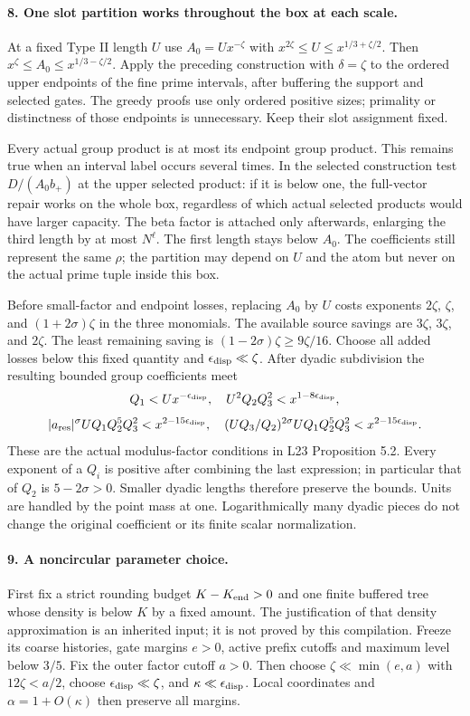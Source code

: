 \paragraph{8. One slot partition works throughout the box at each scale.}
At a fixed Type II length $U$ use $A_0=Ux^{-\zeta}$ with
$x^{2\zeta}\le U\le x^{1/3+\zeta/2}$. Then
$x^\zeta\le A_0\le x^{1/3-\zeta/2}$.
Apply the preceding construction with $\delta=\zeta$ to the ordered
upper endpoints of the fine prime intervals, after buffering the
support and selected gates. The greedy proofs use only ordered
positive sizes; primality or distinctness of those endpoints is
unnecessary. Keep their slot assignment fixed.

Every actual group product is at most its endpoint group product.
This remains true when an interval label occurs several times. In
the selected construction test $D/(A_0b_+)$ at the upper selected
product: if it is below one, the full-vector repair works on the
whole box, regardless of which actual selected products would have
larger capacity. The beta factor is attached only afterwards, enlarging
the third length by at most $N^\ell$. The first length stays below
$A_0$. The coefficients still represent the same $\rho$; the
partition may depend on $U$ and the atom but never on the actual
prime tuple inside this box.

Before small-factor and endpoint losses, replacing $A_0$ by $U$
costs exponents $2\zeta$, $\zeta$, and $(1+2\sigma)\zeta$ in the
three monomials. The available source savings are $3\zeta$,
$3\zeta$, and $2\zeta$. The least remaining saving is
$(1-2\sigma)\zeta\ge9\zeta/16$. Choose all added losses below this
fixed quantity and $\epsilon_{\rm disp}\ll\zeta$. After dyadic
subdivision the resulting bounded group coefficients meet
\[
 Q_1<Ux^{-\epsilon_{\rm disp}},\quad
 U^2Q_2Q_3^2<x^{1-8\epsilon_{\rm disp}},
\]
\[
 |a_{\rm res}|^\sigma UQ_1Q_2^5Q_3^2<x^{2-15\epsilon_{\rm disp}},
 \quad
 (UQ_3/Q_2)^{2\sigma}UQ_1Q_2^5Q_3^2
             <x^{2-15\epsilon_{\rm disp}}.
\]
These are the actual modulus-factor conditions in L23 Proposition 5.2.
Every exponent of a $Q_i$ is positive after combining the last
expression; in particular that of $Q_2$ is $5-2\sigma>0$. Smaller
dyadic lengths therefore preserve the bounds. Units are handled by
the point mass at one. Logarithmically many dyadic pieces do not
change the original coefficient or its finite scalar normalization.

\paragraph{9. A noncircular parameter choice.}
First fix a strict rounding budget $K-K_{\rm end}>0$ and one finite
buffered tree whose density is below $K$ by a fixed amount. The
justification of that density approximation is an inherited input;
it is not proved by this compilation. Freeze its coarse histories,
gate margins $e>0$, active prefix cutoffs and maximum level below
$3/5$. Fix the outer factor cutoff $a>0$. Then choose
$\zeta\ll\min(e,a)$ with $12\zeta<a/2$, choose
$\epsilon_{\rm disp}\ll\zeta$, and $\kappa\ll\epsilon_{\rm disp}$.
Local coordinates and $\alpha=1+O(\kappa)$ then preserve all margins.

